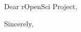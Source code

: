 \documentclass{letter}
\begin{document}
\begin{letter}{}
\opening{Dear rOpenSci Project,}





%
%
%
%
%
%
%
%
%
%


\closing{Sincerely,}
\end{letter}
\end{document}
